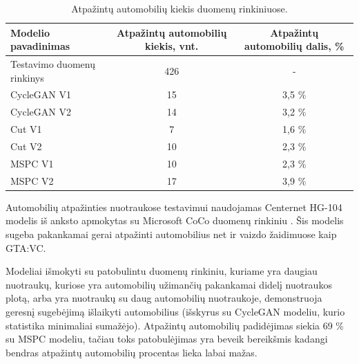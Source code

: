 \documentclass{VUMIFPSkursinis}
\begin{document}
            \begin{table}[H]
                \footnotesize
                \centering
                \caption{Atpažintų automobilių kiekis duomenų rinkiniuose.}
                {\begin{tabular}{|l|c|c|} \hline
                    Modelio pavadinimas & Atpažintų automobilių kiekis, vnt. & Atpažintų automobilių dalis, \% \\
                    \hline
                    Testavimo duomenų rinkinys & 426 & - \\
                    CycleGAN V1 & 15 & 3,5 \% \\
                    CycleGAN V2 & 14 & 3,2 \% \\
                    Cut V1 & 7 & 1,6 \% \\
                    Cut V2 & 10 & 2,3 \% \\ 
                    MSPC V1 & 10 & 2,3 \% \\
                    MSPC V2 & 17 & 3,9 \% \\
                    \hline
                    \end{tabular}
                }
                \label{tab:table example}
            \end{table}
            Automobilių atpažinties nuotraukose testavimui naudojamas Centernet HG-104 \cite{CenterNet} modelis iš anksto apmokytas su Microsoft CoCo duomenų rinkiniu \cite{CocoDataset}. Šis modelis sugeba pakankamai gerai atpažinti automobilius net ir vaizdo žaidimuose kaip GTA:VC.
            
            Modeliai išmokyti su patobulintu duomenų rinkiniu, kuriame yra daugiau nuotraukų, kuriose yra automobilių užimančių pakankamai didelį nuotraukos plotą, arba yra nuotraukų su daug automobilių nuotraukoje, demonstruoja geresnį sugebėjimą išlaikyti automobilius (išskyrus su CycleGAN modeliu, kurio statistika minimaliai sumažėjo). Atpažintų automobilių padidėjimas siekia 69 \% su MSPC modeliu, tačiau toks patobulėjimas yra beveik bereikšmis kadangi bendras atpažintų automobilių procentas lieka labai mažas.
             
\end{document}
